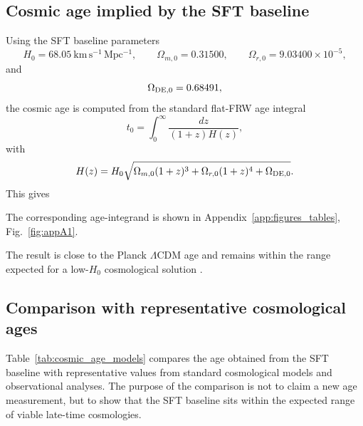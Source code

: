 \documentclass[12pt]{article}
\begin{document}

\subsection{Cosmic age implied by the SFT baseline}

Using the SFT baseline parameters
\[
H_0=68.05~\mathrm{km\,s^{-1}\,Mpc^{-1}},\qquad
\Omega_{m,0}=0.31500,\qquad
\Omega_{r,0}=9.03400\times10^{-5},
\]
and
\[
\Omega_{\rm DE,0}=0.68491,
\]
the cosmic age is computed from the standard flat-FRW age integral
\[
t_0=\int_0^\infty \frac{dz}{(1+z)H(z)},
\]
with
\[
H(z)=H_0
\sqrt{
\Omega_{m,0}(1+z)^3+
\Omega_{r,0}(1+z)^4+
\Omega_{\rm DE,0}
}.
\]
This gives

The corresponding age-integrand is shown in
Appendix~\ref{app:figures_tables},
Fig.~\ref{fig:appA1}.

The result is close to the Planck $\Lambda$CDM age and remains within the
range expected for a low-$H_0$ cosmological solution
\cite{Planck2020,Alam2021,Efstathiou2021}.


\subsection{Comparison with representative cosmological ages}
\label{subsec:cosmic_age_table}

Table~\ref{tab:cosmic_age_models} compares the age obtained from the SFT
baseline with representative values from standard cosmological models and
observational analyses. The purpose of the comparison is not to claim a new
age measurement, but to show that the SFT baseline sits within the expected
range of viable late-time cosmologies.
\end{document}
